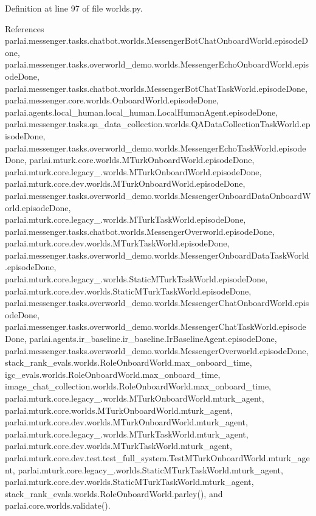 Definition at line 97 of file worlds.\+py.



References parlai.\+messenger.\+tasks.\+chatbot.\+worlds.\+Messenger\+Bot\+Chat\+Onboard\+World.\+episode\+Done, parlai.\+messenger.\+tasks.\+overworld\+\_\+demo.\+worlds.\+Messenger\+Echo\+Onboard\+World.\+episode\+Done, parlai.\+messenger.\+tasks.\+chatbot.\+worlds.\+Messenger\+Bot\+Chat\+Task\+World.\+episode\+Done, parlai.\+messenger.\+core.\+worlds.\+Onboard\+World.\+episode\+Done, parlai.\+agents.\+local\+\_\+human.\+local\+\_\+human.\+Local\+Human\+Agent.\+episode\+Done, parlai.\+messenger.\+tasks.\+qa\+\_\+data\+\_\+collection.\+worlds.\+Q\+A\+Data\+Collection\+Task\+World.\+episode\+Done, parlai.\+messenger.\+tasks.\+overworld\+\_\+demo.\+worlds.\+Messenger\+Echo\+Task\+World.\+episode\+Done, parlai.\+mturk.\+core.\+worlds.\+M\+Turk\+Onboard\+World.\+episode\+Done, parlai.\+mturk.\+core.\+legacy\+\_.\+worlds.\+M\+Turk\+Onboard\+World.\+episode\+Done, parlai.\+mturk.\+core.\+dev.\+worlds.\+M\+Turk\+Onboard\+World.\+episode\+Done, parlai.\+messenger.\+tasks.\+overworld\+\_\+demo.\+worlds.\+Messenger\+Onboard\+Data\+Onboard\+World.\+episode\+Done, parlai.\+mturk.\+core.\+legacy\+\_.\+worlds.\+M\+Turk\+Task\+World.\+episode\+Done, parlai.\+messenger.\+tasks.\+chatbot.\+worlds.\+Messenger\+Overworld.\+episode\+Done, parlai.\+mturk.\+core.\+dev.\+worlds.\+M\+Turk\+Task\+World.\+episode\+Done, parlai.\+messenger.\+tasks.\+overworld\+\_\+demo.\+worlds.\+Messenger\+Onboard\+Data\+Task\+World.\+episode\+Done, parlai.\+mturk.\+core.\+legacy\+\_.\+worlds.\+Static\+M\+Turk\+Task\+World.\+episode\+Done, parlai.\+mturk.\+core.\+dev.\+worlds.\+Static\+M\+Turk\+Task\+World.\+episode\+Done, parlai.\+messenger.\+tasks.\+overworld\+\_\+demo.\+worlds.\+Messenger\+Chat\+Onboard\+World.\+episode\+Done, parlai.\+messenger.\+tasks.\+overworld\+\_\+demo.\+worlds.\+Messenger\+Chat\+Task\+World.\+episode\+Done, parlai.\+agents.\+ir\+\_\+baseline.\+ir\+\_\+baseline.\+Ir\+Baseline\+Agent.\+episode\+Done, parlai.\+messenger.\+tasks.\+overworld\+\_\+demo.\+worlds.\+Messenger\+Overworld.\+episode\+Done, stack\+\_\+rank\+\_\+evals.\+worlds.\+Role\+Onboard\+World.\+max\+\_\+onboard\+\_\+time, igc\+\_\+evals.\+worlds.\+Role\+Onboard\+World.\+max\+\_\+onboard\+\_\+time, image\+\_\+chat\+\_\+collection.\+worlds.\+Role\+Onboard\+World.\+max\+\_\+onboard\+\_\+time, parlai.\+mturk.\+core.\+legacy\+\_.\+worlds.\+M\+Turk\+Onboard\+World.\+mturk\+\_\+agent, parlai.\+mturk.\+core.\+worlds.\+M\+Turk\+Onboard\+World.\+mturk\+\_\+agent, parlai.\+mturk.\+core.\+dev.\+worlds.\+M\+Turk\+Onboard\+World.\+mturk\+\_\+agent, parlai.\+mturk.\+core.\+legacy\+\_.\+worlds.\+M\+Turk\+Task\+World.\+mturk\+\_\+agent, parlai.\+mturk.\+core.\+dev.\+worlds.\+M\+Turk\+Task\+World.\+mturk\+\_\+agent, parlai.\+mturk.\+core.\+dev.\+test.\+test\+\_\+full\+\_\+system.\+Test\+M\+Turk\+Onboard\+World.\+mturk\+\_\+agent, parlai.\+mturk.\+core.\+legacy\+\_.\+worlds.\+Static\+M\+Turk\+Task\+World.\+mturk\+\_\+agent, parlai.\+mturk.\+core.\+dev.\+worlds.\+Static\+M\+Turk\+Task\+World.\+mturk\+\_\+agent, stack\+\_\+rank\+\_\+evals.\+worlds.\+Role\+Onboard\+World.\+parley(), and parlai.\+core.\+worlds.\+validate().

